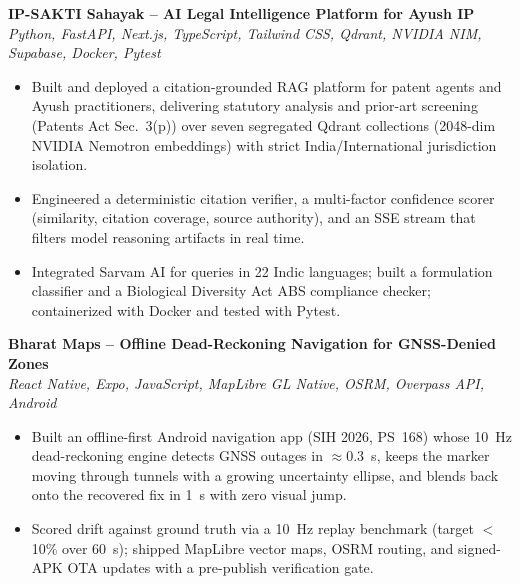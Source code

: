 \documentclass[letterpaper,11pt]{article}
\begin{document}
\vspace{1pt}
\textbf{IP-SAKTI Sahayak -- AI Legal Intelligence Platform for Ayush IP} \\
\hspace*{0.15in}\textit{Python, FastAPI, Next.js, TypeScript, Tailwind CSS, Qdrant, NVIDIA NIM, Supabase, Docker, Pytest}
\begin{itemize}[leftmargin=0.32in,labelsep=0.45em,itemsep=1pt,topsep=2pt,partopsep=0pt,parsep=0pt]
  \item Built and deployed a citation-grounded RAG platform for patent agents and Ayush practitioners,
        delivering statutory analysis and prior-art screening (Patents Act Sec.~3(p)) over seven
        segregated Qdrant collections (2048-dim NVIDIA Nemotron embeddings) with strict
        India/International jurisdiction isolation.
  \item Engineered a deterministic citation verifier, a multi-factor confidence scorer (similarity, citation
        coverage, source authority), and an SSE stream that filters model reasoning artifacts in real time.
  \item Integrated Sarvam AI for queries in 22 Indic languages; built a formulation classifier and a
        Biological Diversity Act ABS compliance checker; containerized with Docker and tested with Pytest.
\end{itemize}

\vspace{1pt}
\textbf{Bharat Maps -- Offline Dead-Reckoning Navigation for GNSS-Denied Zones} \\
\hspace*{0.15in}\textit{React Native, Expo, JavaScript, MapLibre GL Native, OSRM, Overpass API, Android}
\begin{itemize}[leftmargin=0.32in,labelsep=0.45em,itemsep=1pt,topsep=2pt,partopsep=0pt,parsep=0pt]
  \item Built an offline-first Android navigation app (SIH 2026, PS~168) whose 10~Hz dead-reckoning engine detects
        GNSS outages in $\approx$0.3~s, keeps the marker moving through tunnels with a growing uncertainty ellipse,
        and blends back onto the recovered fix in 1~s with zero visual jump.
  \item Scored drift against ground truth via a 10~Hz replay benchmark (target $<$10\% over 60~s); shipped MapLibre
        vector maps, OSRM routing, and signed-APK OTA updates with a pre-publish verification gate.
\end{itemize}
\end{document}
